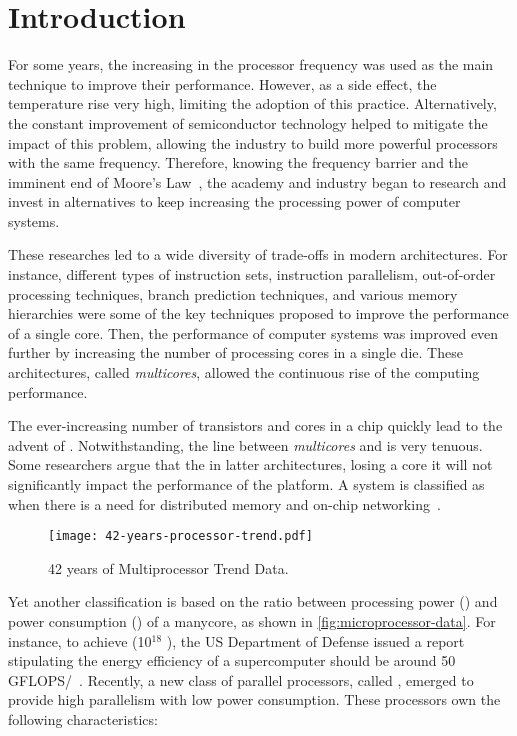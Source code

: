 \chapter{Introduction}
\label{ch.intro}

	For some years, the increasing in the processor frequency was used
	as the main technique to improve their performance.
	However, as a side effect, the temperature rise very high, limiting the
	adoption of this practice.
	Alternatively, the constant improvement of semiconductor technology helped
	to mitigate the impact of this problem, allowing the industry to build
	more powerful processors with the same frequency.
	Therefore, knowing the frequency barrier and the imminent end of Moore's Law~\cite{moore:1965},
	the academy and industry began to research and invest in alternatives
	to keep increasing the processing power of computer systems.

	These researches led to a wide diversity of trade-offs in modern architectures.
	For instance, different types of instruction sets, instruction parallelism,
	out-of-order processing techniques, branch prediction techniques, and various
	memory hierarchies were some of the key techniques proposed to improve the
	performance of a single core.
	Then, the performance of computer systems was improved even further by
	increasing the number of processing cores in a single die.
	These architectures, called \textit{multicores}, allowed the continuous
	rise of the computing performance.

	The ever-increasing number of transistors and cores in a chip quickly lead
	to the advent of \manycores.
	Notwithstanding, the line between \textit{multicores} and \manycores is very tenuous.
	Some researchers argue that the in latter architectures, losing a core it will not
	significantly impact the performance of the platform.
	A system is classified as \manycore when there is a need for distributed
	memory and on-chip networking~\cite{freitas:thesis}.

	\begin{figure}[t]
		\centering%
		\caption{42 years of Multiprocessor Trend Data.}%
		\label{fig:microprocessor-data}%
		\texttt{[image: 42-years-processor-trend.pdf]}%
	\end{figure}

	Yet another classification is based on the ratio between processing power (\flops)
	and power consumption (\watts) of a manycore, as shown in \autoref{fig:microprocessor-data}.
	For instance, to achieve \exascale (10$^{18}$ \flops), the US Department of Defense
	issued a report stipulating the energy efficiency of a supercomputer should be
	around 50 GFLOPS/\watts~\cite{darpa:exascale}.
	Recently, a new class of parallel processors, called \lightweight \manycores,
	emerged to provide high parallelism with low power consumption.
	These processors own the following characteristics:

